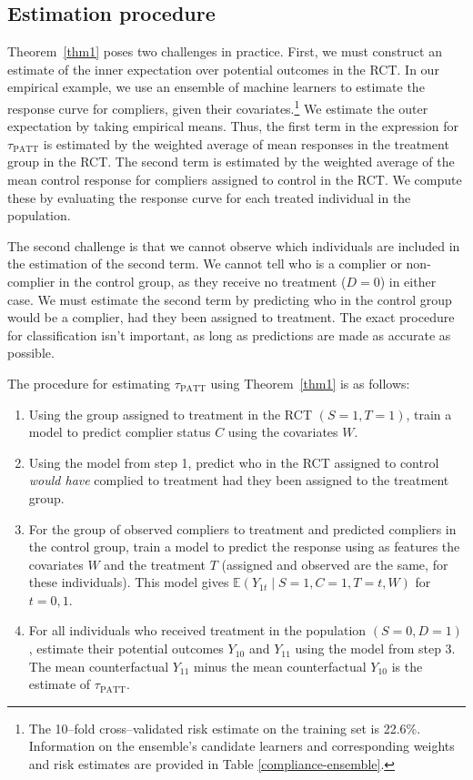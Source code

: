 \documentclass[12pt]{article}
\newcommand{\ex}{\mathbb{E}} %
\begin{document}
\subsection{Estimation procedure}
Theorem~\ref{thm1} poses two challenges in practice.  First, we must construct an estimate of the inner expectation over potential outcomes in the RCT.  In our empirical example, we use an ensemble of machine learners \citep{van2007} to estimate the response curve for compliers, given their covariates.\footnote{The 10--fold cross--validated risk estimate on the training set is 22.6\%. Information on the ensemble's candidate learners and corresponding weights and risk estimates are provided in Table \ref{compliance-ensemble}.}  We estimate the outer expectation by taking empirical means.  Thus, the first term in the expression for $\tau_{\text{PATT}}$ is estimated by the weighted average of mean responses in the treatment group in the RCT. The second term is estimated by the weighted average of the mean control response for compliers assigned to control in the RCT.  We compute these by evaluating the response curve for each treated individual in the population.  

The second challenge is that we cannot observe which individuals are included in the estimation of the second term. We cannot tell who is a complier or non-complier in the control group, as they receive no treatment ($D=0$) in either case.  We must estimate the second term by predicting who in the control group would be a complier, had they been assigned to treatment.  The exact procedure for classification isn't important, as long as predictions are made as accurate as possible. 

The procedure for estimating $\tau_{\text{PATT}}$ using Theorem~\ref{thm1} is as follows:
\begin{enumerate}
\item Using the group assigned to treatment in the RCT $(S=1, T=1)$, train a model to predict complier status $C$ using the covariates $W$.
\item Using the model from step 1, predict who in the RCT assigned to control \textit{would have} complied to treatment had they been assigned to the treatment group.
\item For the group of observed compliers to treatment and predicted compliers in the control group, train a model to predict the response using as features the covariates $W$ and the treatment $T$ (assigned and observed are the same, for these individuals).  This model gives $\ex(Y_{1t} \mid S=1, C=1, T=t, W)$ for $t = 0,1$.
\item For all individuals who received treatment in the population $(S=0, D=1)$, estimate their potential outcomes $Y_{10}$ and $Y_{11}$ using the model from step 3.  The mean counterfactual $Y_{11}$ minus the mean counterfactual $Y_{10}$ is the estimate of $\tau_{\text{PATT}}$.
\end{enumerate}
\end{document}
